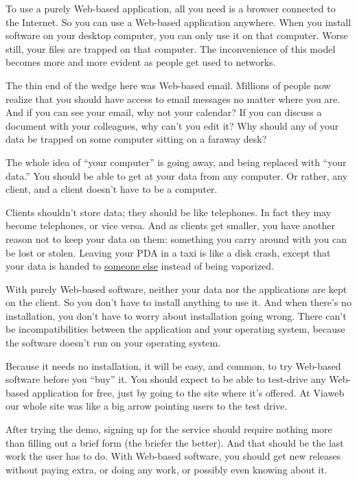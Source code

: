 To use a purely Web-based application, all you need is a browser
connected to the Internet. So you can use a Web-based application
anywhere. When you install software on your desktop computer, you can
only use it on that computer. Worse still, your files are trapped on
that computer. The inconvenience of this model becomes more and more
evident as people get used to networks.

The thin end of the wedge here was Web-based email. Millions of people
now realize that you should have access to email messages no matter
where you are. And if you can see your email, why not your calendar? If
you can discuss a document with your colleagues, why can't you edit it?
Why should any of your data be trapped on some computer sitting on a
faraway desk?

The whole idea of ``your computer'' is going away, and being replaced
with ``your data.'' You should be able to get at your data from any
computer. Or rather, any client, and a client doesn't have to be a
computer.

Clients shouldn't store data; they should be like telephones. In fact
they may become telephones, or vice versa. And as clients get smaller,
you have another reason not to keep your data on them: something you
carry around with you can be lost or stolen. Leaving your PDA in a taxi
is like a disk crash, except that your data is handed to
\href{http://news.zdnet.co.uk/business/0,39020645,2077931,00.htm}{someone
else} instead of being vaporized.

With purely Web-based software, neither your data nor the applications
are kept on the client. So you don't have to install anything to use it.
And when there's no installation, you don't have to worry about
installation going wrong. There can't be incompatibilities between the
application and your operating system, because the software doesn't run
on your operating system.

Because it needs no installation, it will be easy, and common, to try
Web-based software before you ``buy'' it. You should expect to be able
to test-drive any Web-based application for free, just by going to the
site where it's offered. At Viaweb our whole site was like a big arrow
pointing users to the test drive.

After trying the demo, signing up for the service should require nothing
more than filling out a brief form (the briefer the better). And that
should be the last work the user has to do. With Web-based software, you
should get new releases without paying extra, or doing any work, or
possibly even knowing about it.

